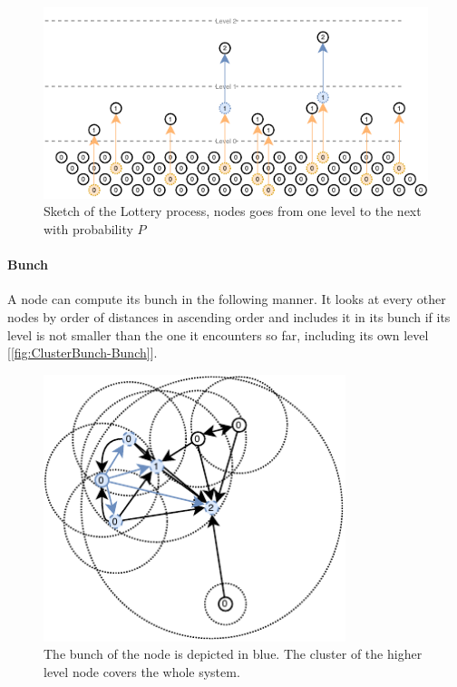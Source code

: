 \documentclass[a4paper,11pt,oneside]{report}
\begin{document}
\begin{figure}[!h] 
\centering
\includegraphics[width=400pt]{figures/Lottery-Standard}
\caption{Sketch of the Lottery process, nodes goes from one level to the next with probability $P$}
\label{fig:ClusterBunch-Bunch}
\end{figure}

\paragraph{Bunch} A node can compute its bunch in the following manner. It
looks at every other nodes by order of distances in ascending order and
includes it in its bunch if its level is not smaller than the one it encounters
so far, including its own level [\autoref{fig:ClusterBunch-Bunch}]. 

\begin{figure}[!h] 
\centering
\includegraphics[width=250pt]{figures/ClusterBunch-Bunch}
\caption{ The bunch of the node is depicted in blue. The cluster of the higher level node covers the whole system. }
\label{fig:ClusterBunch-Bunch}
\end{figure}
\end{document}
